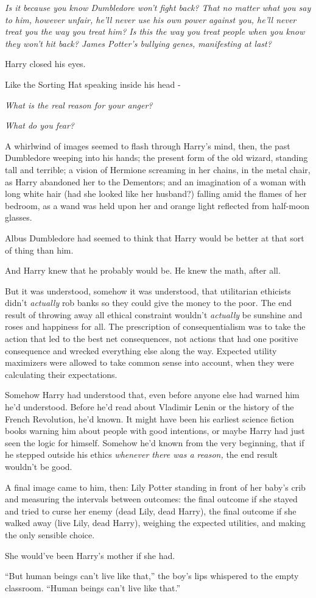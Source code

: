 \emph{Is it because you know Dumbledore won't fight back? That no matter
what you say to him, however unfair, he'll never use his own power
against you, he'll never treat you the way you treat him? Is this the
way you treat people when you know they won't hit back? James Potter's
bullying genes, manifesting at last?}

Harry closed his eyes.

Like the Sorting Hat speaking inside his head -

\emph{What is the real reason for your anger?}

\emph{What do you fear?}

A whirlwind of images seemed to flash through Harry's mind, then, the
past Dumbledore weeping into his hands; the present form of the old
wizard, standing tall and terrible; a vision of Hermione screaming in
her chains, in the metal chair, as Harry abandoned her to the Dementors;
and an imagination of a woman with long white hair (had she looked like
her husband?) falling amid the flames of her bedroom, as a wand was held
upon her and orange light reflected from half-moon glasses.

Albus Dumbledore had seemed to think that Harry would be better at that
sort of thing than him.

And Harry knew that he probably would be. He knew the math, after all.

But it was understood, somehow it was understood, that utilitarian
ethicists didn't \emph{actually} rob banks so they could give the money
to the poor. The end result of throwing away all ethical constraint
wouldn't \emph{actually} be sunshine and roses and happiness for all.
The prescription of consequentialism was to take the action that led to
the best net consequences, not actions that had one positive consequence
and wrecked everything else along the way. Expected utility maximizers
were allowed to take common sense into account, when they were
calculating their expectations.

Somehow Harry had understood that, even before anyone else had warned
him he'd understood. Before he'd read about Vladimir Lenin or the
history of the French Revolution, he'd known. It might have been his
earliest science fiction books warning him about people with good
intentions, or maybe Harry had just seen the logic for himself. Somehow
he'd known from the very beginning, that if he stepped outside his
ethics \emph{whenever there was a reason,} the end result wouldn't be
good.

A final image came to him, then: Lily Potter standing in front of her
baby's crib and measuring the intervals between outcomes: the final
outcome if she stayed and tried to curse her enemy (dead Lily, dead
Harry), the final outcome if she walked away (live Lily, dead Harry),
weighing the expected utilities, and making the only sensible choice.

She would've been Harry's mother if she had.

``But human beings can't live like that,'' the boy's lips whispered to
the empty classroom. ``Human beings can't live like that.''
